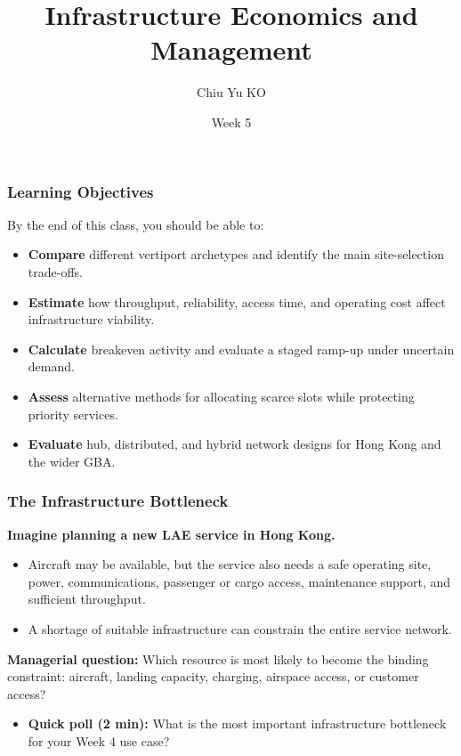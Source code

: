 \documentclass{beamer}
\begin{document}
\begin{frame}
  \title{Infrastructure Economics and Management}
  \author{Chiu Yu KO}
  \date{Week 5}
  \titlepage
\end{frame}

\begin{frame}[t]
\frametitle{Learning Objectives}
By the end of this class, you should be able to:
\begin{itemize}
\item \textbf{Compare} different vertiport archetypes and identify the main site-selection trade-offs.
\item \textbf{Estimate} how throughput, reliability, access time, and operating cost affect infrastructure viability.
\item \textbf{Calculate} breakeven activity and evaluate a staged ramp-up under uncertain demand.
\item \textbf{Assess} alternative methods for allocating scarce slots while protecting priority services.
\item \textbf{Evaluate} hub, distributed, and hybrid network designs for Hong Kong and the wider GBA.
\end{itemize}
\end{frame}

\begin{frame}[t]
\frametitle{The Infrastructure Bottleneck}
\textbf{Imagine planning a new LAE service in Hong Kong.}
\begin{itemize}
\item Aircraft may be available, but the service also needs a safe operating site, power, communications, passenger or cargo access, maintenance support, and sufficient throughput.
\item A shortage of suitable infrastructure can constrain the entire service network.
\end{itemize}
\vspace{0.3cm}
\textbf{Managerial question:} Which resource is most likely to become the binding constraint: aircraft, landing capacity, charging, airspace access, or customer access?
\begin{itemize}
\item \textbf{Quick poll (2 min):} What is the most important infrastructure bottleneck for your Week 4 use case?
\end{itemize}
\end{frame}
\end{document}
